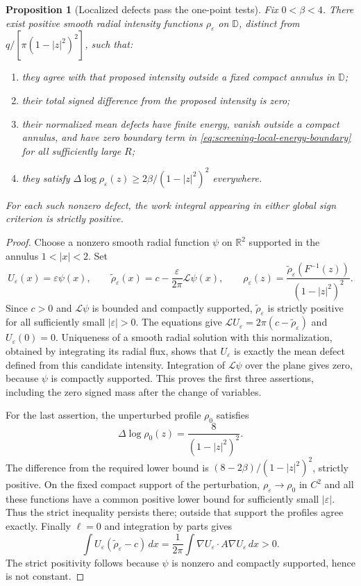 \documentclass[11pt,a4paper]{article}
\numberwithin{equation}{section}
\newtheorem{proposition}[theorem]{Proposition}
\theoremstyle{definition}
\theoremstyle{remark}
\newcommand{\D}{\mathbb D}
\begin{document}
\begin{proposition}[Localized defects pass the one-point tests]
\label{prop:screening-localized-profile-defects}
Fix $0<\beta<4$.  There exist positive smooth radial intensity
functions $\rho_\varepsilon$ on $\D$, distinct from
$q/[\pi(1-|z|^2)^2]$, such that:
\begin{enumerate}
\item they agree with that proposed intensity outside a fixed compact
annulus in $\D$;
\item their total signed difference from the proposed intensity is zero;
\item their normalized mean defects have finite energy, vanish outside
a compact annulus, and have zero boundary term in
\eqref{eq:screening-local-energy-boundary} for all sufficiently large $R$;
\item they satisfy
$\Delta\log\rho_\varepsilon(z)\ge
2\beta/(1-|z|^2)^2$ everywhere.
\end{enumerate}
For each such nonzero defect, the work integral appearing in either
global sign criterion is strictly positive.
\end{proposition}

\begin{proof}
Choose a nonzero smooth radial function $\psi$ on $\mathbb R^2$
supported in the annulus $1<|x|<2$.  Set
\[
 U_\varepsilon(x)=\varepsilon\psi(x),\qquad
 \widetilde\rho_\varepsilon(x)
       =c-\frac\varepsilon{2\pi}\mathcal L\psi(x),\qquad
 \rho_\varepsilon(z)
       =\frac{\widetilde\rho_\varepsilon(F^{-1}(z))}
                    {(1-|z|^2)^2}.
\]
Since $c>0$ and $\mathcal L\psi$ is bounded and compactly
supported, $\widetilde\rho_\varepsilon$ is strictly positive for
all sufficiently small $|\varepsilon|>0$.  The equations give
$\mathcal LU_\varepsilon=2\pi(c-\widetilde\rho_\varepsilon)$
and $U_\varepsilon(0)=0$.  Uniqueness of a smooth radial solution
with this normalization, obtained by integrating its radial flux,
shows that $U_\varepsilon$ is exactly the mean defect defined from
this candidate intensity.  Integration of $\mathcal L\psi$ over
the plane gives zero, because $\psi$ is compactly supported.
This proves the first three assertions, including the zero signed
mass after the change of variables.

For the last assertion, the unperturbed profile $\rho_0$ satisfies
\[
 \Delta\log\rho_0(z)=\frac8{(1-|z|^2)^2}.
\]
The difference from the required lower bound is
$(8-2\beta)/(1-|z|^2)^2$, strictly positive.  On the fixed compact
support of the perturbation, $\rho_\varepsilon\to\rho_0$ in
$C^2$ and all these functions have a common positive lower bound
for sufficiently small $|\varepsilon|$.  Thus the strict inequality
persists there; outside that support the profiles agree exactly.
Finally $\ell=0$ and integration by parts gives
\[
 \int U_\varepsilon(\widetilde\rho_\varepsilon-c)\,dx
       =\frac1{2\pi}\int\nabla U_\varepsilon\cdot
                         A\nabla U_\varepsilon\,dx>0.
\]
The strict positivity follows because $\psi$ is nonzero and
compactly supported, hence is not constant.
\end{proof}
\end{document}
